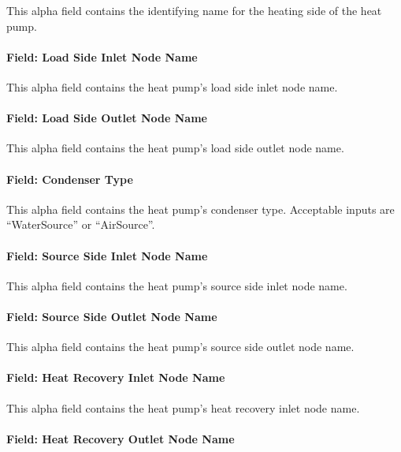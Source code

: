 This alpha field contains the identifying name for the heating side of the heat pump.

\paragraph{Field: Load Side Inlet Node Name}\label{plhp_eir_heating_inputs_load_inlet_node}

This alpha field contains the heat pump's load side inlet node name.

\paragraph{Field: Load Side Outlet Node Name}\label{plhp_eir_heating_inputs_load_outlet_node}

This alpha field contains the heat pump's load side outlet node name.

\paragraph{Field: Condenser Type}\label{plhp_eir_condenser_type}

This alpha field contains the heat pump's condenser type. Acceptable inputs are ``WaterSource'' or ``AirSource''.

\paragraph{Field: Source Side Inlet Node Name}\label{plhp_eir_heating_inputs_source_inlet_node}

This alpha field contains the heat pump's source side inlet node name.

\paragraph{Field: Source Side Outlet Node Name}\label{plhp_eir_heating_inputs_source_outlet_node}

This alpha field contains the heat pump's source side outlet node name.

\paragraph{Field: Heat Recovery Inlet Node Name}\label{plhp_eir_heating_inputs_heat_recovery_inlet_node}

This alpha field contains the heat pump's heat recovery inlet node name.

\paragraph{Field: Heat Recovery Outlet Node Name}\label{plhp_eir_heating_inputs_heat_recovery_outlet_node}

